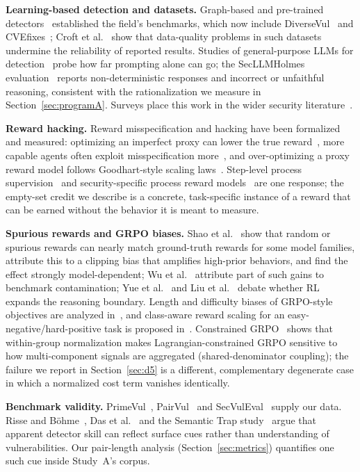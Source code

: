 \documentclass[journal]{IEEEtran}
\begin{document}
\textbf{Learning-based detection and datasets.} Graph-based and pre-trained detectors~\cite{devign,deepdfa,codebert} established the field's benchmarks, which now include DiverseVul~\cite{diversevul} and CVEfixes~\cite{cvefixes}; Croft et al.~\cite{croft} show that data-quality problems in such datasets undermine the reliability of reported results. Studies of general-purpose LLMs for detection~\cite{zhou24,vulbench,ullah} probe how far prompting alone can go; the SecLLMHolmes evaluation~\cite{ullah} reports non-deterministic responses and incorrect or unfaithful reasoning, consistent with the rationalization we measure in Section~\ref{sec:programA}. Surveys place this work in the wider security literature~\cite{xu}.

\textbf{Reward hacking.} Reward misspecification and hacking have been formalized and measured: optimizing an imperfect proxy can lower the true reward~\cite{skalse}, more capable agents often exploit misspecification more~\cite{pan}, and over-optimizing a proxy reward model follows Goodhart-style scaling laws~\cite{gao}. Step-level process supervision~\cite{lightman} and security-specific process reward models~\cite{seccodeprm} are one response; the empty-set credit we describe is a concrete, task-specific instance of a reward that can be earned without the behavior it is meant to measure.

\textbf{Spurious rewards and GRPO biases.} Shao et al.~\cite{spurious} show that random or spurious rewards can nearly match ground-truth rewards for some model families, attribute this to a clipping bias that amplifies high-prior behaviors, and find the effect strongly model-dependent; Wu et al.~\cite{wucontam} attribute part of such gains to benchmark contamination; Yue et al.~\cite{yue} and Liu et al.~\cite{prorl} debate whether RL expands the reasoning boundary. Length and difficulty biases of GRPO-style objectives are analyzed in~\cite{drgrpo,dapo}, and class-aware reward scaling for an easy-negative/hard-positive task is proposed in~\cite{rlfourhs}. Constrained GRPO~\cite{constrained} shows that within-group normalization makes Lagrangian-constrained GRPO sensitive to how multi-component signals are aggregated (shared-denominator coupling); the failure we report in Section~\ref{sec:d5} is a different, complementary degenerate case in which a normalized cost term vanishes identically.

\textbf{Benchmark validity.} PrimeVul~\cite{primevul}, PairVul~\cite{vulrag} and SecVulEval~\cite{secvuleval} supply our data. Risse and B\"ohme~\cite{risse}, Das et al.~\cite{das} and the Semantic Trap study~\cite{semantictrap} argue that apparent detector skill can reflect surface cues rather than understanding of vulnerabilities. Our pair-length analysis (Section~\ref{sec:metrics}) quantifies one such cue inside Study~A's corpus.
\end{document}
